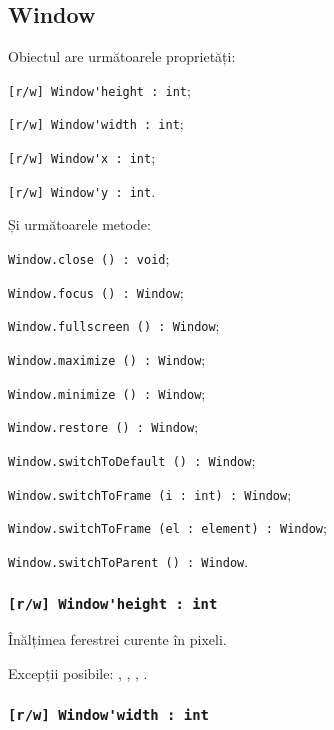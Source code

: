 \subsection{{\color{orange} Window}}

Obiectul \window{} are următoarele proprietăți:
\begin{icItems}
	\item \lstinline|[r/w] Window'height : int|;
	\item \lstinline|[r/w] Window'width : int|;
	\item \lstinline|[r/w] Window'x : int|;
	\item \lstinline|[r/w] Window'y : int|.
\end{icItems}

Și următoarele metode:
\begin{icItems}
	\item \lstinline|Window.close () : void|;
	\item \lstinline|Window.focus () : Window|;
	\item \lstinline|Window.fullscreen () : Window|;
	\item \lstinline|Window.maximize () : Window|;
	\item \lstinline|Window.minimize () : Window|;
	\item \lstinline|Window.restore () : Window|;
	\item \lstinline|Window.switchToDefault () : Window|;
	\item \lstinline|Window.switchToFrame (i : int) : Window|;
	\item \lstinline|Window.switchToFrame (el : element) : Window|;
	\item \lstinline|Window.switchToParent () : Window|.
\end{icItems}

\subsubsection{\lstinline|[r/w] Window'height : int|}

Înălțimea ferestrei curente în pixeli.

Excepții posibile: , , , .

\subsubsection{\lstinline|[r/w] Window'width : int|}

